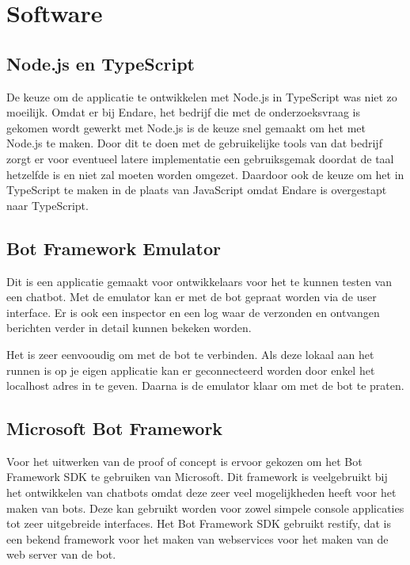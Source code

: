 \section{Software}
\label{sec:POC}

\subsection{Node.js en TypeScript}
\label{ts}

De keuze om de applicatie te ontwikkelen met Node.js in TypeScript was niet zo moeilijk. Omdat er bij Endare, het bedrijf die met de onderzoeksvraag is gekomen wordt gewerkt met Node.js is de keuze snel gemaakt om het met Node.js te maken. Door dit te doen met de gebruikelijke tools van dat bedrijf zorgt er voor eventueel latere implementatie een gebruiksgemak doordat de taal hetzelfde is en niet zal moeten worden omgezet. Daardoor ook de keuze om het in TypeScript te maken in de plaats van JavaScript omdat Endare is overgestapt naar TypeScript.

\subsection{Bot Framework Emulator}
\label{emulator}

Dit is een applicatie gemaakt voor ontwikkelaars voor het te kunnen testen van een chatbot. Met de emulator kan er met de bot gepraat worden via de user interface. Er is ook een inspector en een log waar de verzonden en ontvangen berichten verder in detail kunnen bekeken worden.

Het is zeer eenvooudig om met de bot te verbinden. Als deze lokaal aan het runnen is op je eigen applicatie kan er geconnecteerd worden door enkel het localhost adres in te geven. Daarna is de emulator klaar om met de bot te praten.

\subsection{Microsoft Bot Framework}
\label{botFramework}

Voor het uitwerken van de proof of concept is ervoor gekozen om het Bot Framework SDK te gebruiken van Microsoft. Dit framework is veelgebruikt bij het ontwikkelen van chatbots omdat deze zeer veel mogelijkheden heeft voor het maken van bots. Deze kan gebruikt worden voor zowel simpele console applicaties tot zeer uitgebreide interfaces. Het Bot Framework SDK gebruikt restify, dat is een bekend framework voor het maken van webservices voor het maken van de web server van de bot.

